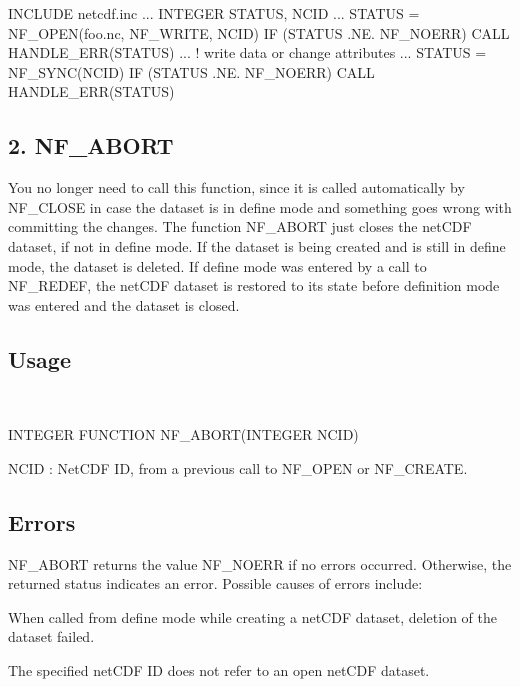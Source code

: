 I\+N\+C\+L\+U\+DE \textquotesingle{}netcdf.\+inc\textquotesingle{} ... I\+N\+T\+E\+G\+ER S\+T\+A\+T\+US, N\+C\+ID ... S\+T\+A\+T\+US = N\+F\+\_\+\+O\+P\+EN(\textquotesingle{}foo.\+nc\textquotesingle{}, N\+F\+\_\+\+W\+R\+I\+TE, N\+C\+ID) IF (S\+T\+A\+T\+US .NE. N\+F\+\_\+\+N\+O\+E\+RR) C\+A\+LL H\+A\+N\+D\+L\+E\+\_\+\+E\+R\+R(\+S\+T\+A\+T\+U\+S) ... ! write data or change attributes ... S\+T\+A\+T\+US = N\+F\+\_\+\+S\+Y\+N\+C(\+N\+C\+I\+D) IF (S\+T\+A\+T\+US .NE. N\+F\+\_\+\+N\+O\+E\+RR) C\+A\+LL H\+A\+N\+D\+L\+E\+\_\+\+E\+R\+R(\+S\+T\+A\+T\+U\+S)\hypertarget{nc_f77_interface_guide_f77_NF-ABORT}{}\subsection{2. N\+F\+\_\+\+A\+B\+O\+R\+T }\label{nc_f77_interface_guide_f77_NF-ABORT}
You no longer need to call this function, since it is called automatically by N\+F\+\_\+\+C\+L\+O\+SE in case the dataset is in define mode and something goes wrong with committing the changes. The function N\+F\+\_\+\+A\+B\+O\+RT just closes the net\+C\+DF dataset, if not in define mode. If the dataset is being created and is still in define mode, the dataset is deleted. If define mode was entered by a call to N\+F\+\_\+\+R\+E\+D\+EF, the net\+C\+DF dataset is restored to its state before definition mode was entered and the dataset is closed.

\subsection*{Usage }

 

I\+N\+T\+E\+G\+ER F\+U\+N\+C\+T\+I\+ON N\+F\+\_\+\+A\+B\+O\+R\+T(\+I\+N\+T\+E\+G\+E\+R N\+C\+I\+D)

{\ttfamily N\+C\+ID} \+: Net\+C\+DF ID, from a previous call to N\+F\+\_\+\+O\+P\+EN or N\+F\+\_\+\+C\+R\+E\+A\+TE.

\subsection*{Errors }

N\+F\+\_\+\+A\+B\+O\+RT returns the value N\+F\+\_\+\+N\+O\+E\+RR if no errors occurred. Otherwise, the returned status indicates an error. Possible causes of errors include\+:


\begin{DoxyItemize}
\item When called from define mode while creating a net\+C\+DF dataset, deletion of the dataset failed.
\item The specified net\+C\+DF ID does not refer to an open net\+C\+DF dataset.
\end{DoxyItemize}

